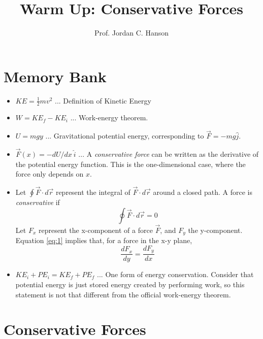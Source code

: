 \documentclass{article}
\begin{document}
\small
\title{Warm Up: Conservative Forces}
\author{Prof. Jordan C. Hanson}

\maketitle
\small

\section{Memory Bank}

\begin{itemize}
\item $KE = \frac{1}{2}m v^2$ ... Definition of Kinetic Energy
\item $W = KE_f - KE_i$ ... Work-energy theorem.
\item $U = mgy$ ... Gravitational potential energy, corresponding to $\vec{F} = -mg \hat{j}$.
\item $\vec{F}(x) = -dU/dx ~ \hat{i}$ ... A \textit{conservative force} can be written as the derivative of the potential energy function.  This is the one-dimensional case, where the force only depends on $x$.
\item Let $\oint \vec{F}\cdot d\vec{r}$ represent the integral of $\vec{F}\cdot d\vec{r}$ around a closed path.  A force is \textit{conservative} if
\begin{equation}
\oint \vec{F} \cdot d\vec{r} = 0 \label{eq:1}
\end{equation}
Let $F_x$ represent the x-component of a force $\vec{F}$, and $F_y$ the y-component.  Equation \ref{eq:1} implies that, for a force in the x-y plane,
\begin{equation}
\frac{dF_x}{dy} = \frac{dF_y}{dx}
\end{equation}
\item $KE_i + PE_i = KE_f + PE_f$ ... One form of energy conservation.  Consider that potential energy is just stored energy created by performing work, so this statement is not that different from the official work-energy theorem.
\end{itemize}

\section{Conservative Forces}
\end{document}
